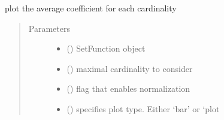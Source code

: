 \documentclass[letterpaper,10pt,english]{sphinxmanual}
\begin{document}
\begin{fulllineitems}
\label{\detokenize{setFTs:setFTs.plotting.plot_spectral_energy}}
\sphinxAtStartPar
plot the average coefficient for each cardinality
\begin{quote}\begin{description}
\item[{Parameters}] \leavevmode\begin{itemize}
\item {} 
\sphinxAtStartPar
{} ({\hyperref[\detokenize{setFTs:setFTs.setfunctions.SetFunction}]{}}) \textendash{} SetFunction object

\item {} 
\sphinxAtStartPar
{} () \textendash{} maximal cardinality to consider

\item {} 
\sphinxAtStartPar
{} () \textendash{} flag that enables normalization

\item {} 
\sphinxAtStartPar
{} () \textendash{} specifies plot type. Either ‘bar’ or ‘plot

\end{itemize}

\end{description}\end{quote}

\end{fulllineitems}

\end{document}
